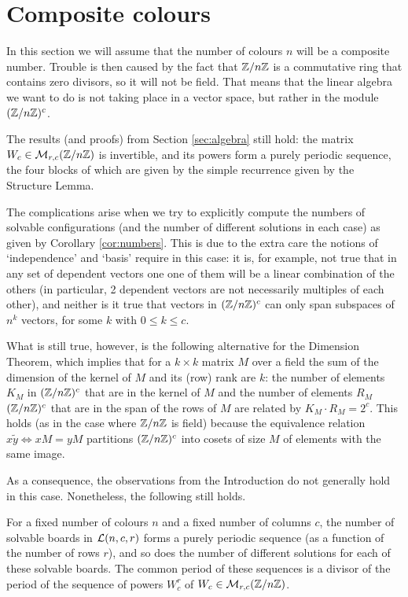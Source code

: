 \section{Composite colours}\label{sec:comp}
In this section we will assume that the number of colours $n$
will be a composite number. Trouble is then caused by the fact
that $\mathbb{Z}/n\mathbb{Z}$ is a commutative ring that contains zero divisors,
so it will not be field. That means that the linear algebra we
want to do is not taking place in a vector space, but rather
in the module $(\mathbb{Z}/n\mathbb{Z})^c$.

The results (and proofs) from Section \ref{sec:algebra} still hold:
the matrix $W_c\in\mathcal{M}_{r,c}(\mathbb{Z}/n\mathbb{Z})$ is invertible, and its
powers form a purely periodic sequence, the four blocks of which
are given by the simple recurrence given by the Structure Lemma.

The complications arise when we try to explicitly compute
the numbers of solvable configurations (and the number of
different solutions in each case) as given by Corollary \ref{cor:numbers}.
This is due to the extra care the notions of `independence'
and `basis' require in this case: it is, for example, not true that
in any set of dependent vectors one one of them will be a linear combination
of the others (in particular, 2 dependent vectors are not
necessarily multiples of each other),
and neither is it true that vectors in $(\mathbb{Z}/n\mathbb{Z})^c$ can only span
subspaces of $n^k$ vectors, for some $k$ with $0\leq k\leq c$.

What is still true, however, is the following alternative for
the Dimension Theorem, which implies that for a $k\times k$
matrix $M$ over a field the sum of the dimension of the kernel
of $M$ and its (row) rank are $k$:
the number of elements $K_M$ in $(\mathbb{Z}/n\mathbb{Z})^c$ that are in the kernel
of $M$ and the number of elements $R_M$ $(\mathbb{Z}/n\mathbb{Z})^c$ that are in the 
span of the rows of $M$ are related by $K_M\cdot R_M=2^c$.
This holds (as in the case where $\mathbb{Z}/n\mathbb{Z}$ is field) because
the equivalence relation $x\tilde y\iff xM=yM$ partitions
$(\mathbb{Z}/n\mathbb{Z})^c$ into cosets of size $M$ of elements
with the same image.

As a consequence, the observations from the Introduction do not
generally hold in this case. Nonetheless, the following still holds.

\begin{theorem}
For a fixed number of colours $n$ and a fixed number of columns $c$,
the number of solvable boards in $\mathcal{L}(n, c, r)$ forms a purely periodic
sequence (as a function of the number of rows $r$), and so does the
number of different solutions for each of these solvable boards.
The common period of these sequences is a divisor of the period of the sequence
of powers $W_c^r$ of $W_c\in\mathcal{M}_{r,c}(\mathbb{Z}/n\mathbb{Z})$.
\end{theorem}

